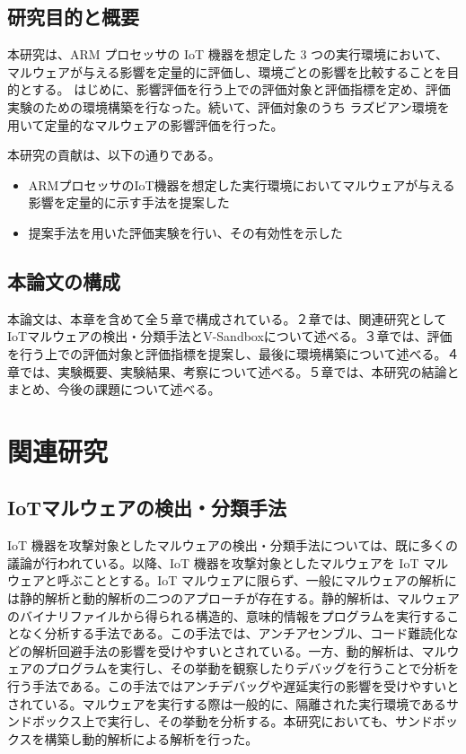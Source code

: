 \documentclass[12pt,a4paper,titlepage,report]{jsbook}
\begin{document}
\section{研究目的と概要}
本研究は、ARM プロセッサの IoT 機器を想定した 3 つの実行環境において、マルウェアが与える影響を定量的に評価し、環境ごとの影響を比較することを目的とする。
はじめに、影響評価を行う上での評価対象と評価指標を定め、評価実験のための環境構築を行なった。続いて、評価対象のうち ラズビアン環境を用いて定量的なマルウェアの影響評価を行った。


本研究の貢献は、以下の通りである。
\begin{itemize}
    \item ARMプロセッサのIoT機器を想定した実行環境においてマルウェアが与える影響を定量的に示す手法を提案した
    \item 提案手法を用いた評価実験を行い、その有効性を示した
\end{itemize}

\section{本論文の構成}
本論文は、本章を含めて全５章で構成されている。２章では、関連研究としてIoTマルウェアの検出・分類手法とV-Sandboxについて述べる。３章では、評価を行う上での評価対象と評価指標を提案し、最後に環境構築について述べる。４章では、実験概要、実験結果、考察について述べる。５章では、本研究の結論とまとめ、今後の課題について述べる。

\chapter{関連研究}
\section{IoTマルウェアの検出・分類手法}
IoT 機器を攻撃対象としたマルウェアの検出・分類手法については、既に多くの議論が行われている。以降、IoT 機器を攻撃対象としたマルウェアを IoT マルウェアと呼ぶこととする。IoT マルウェアに限らず、一般にマルウェアの解析には静的解析と動的解析の二つのアプローチが存在する。静的解析は、マルウェアのバイナリファイルから得られる構造的、意味的情報をプログラムを実行することなく分析する手法である。この手法では、アンチアセンブル、コード難読化などの解析回避手法の影響を受けやすいとされている。一方、動的解析は、マルウェアのプログラムを実行し、その挙動を観察したりデバッグを行うことで分析を行う手法である。この手法ではアンチデバッグや遅延実行の影響を受けやすいとされている。マルウェアを実行する際は一般的に、隔離された実行環境であるサンドボックス上で実行し、その挙動を分析する。本研究においても、サンドボックスを構築し動的解析による解析を行った。
\end{document}
